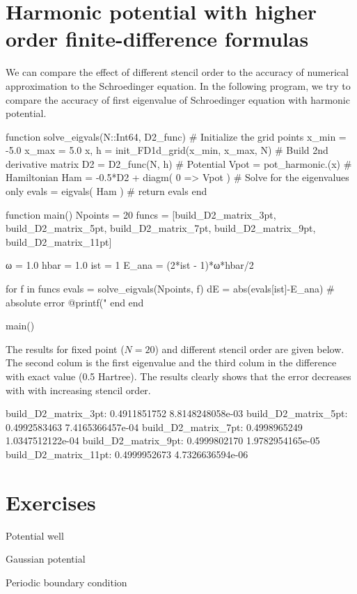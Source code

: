 \section{Harmonic potential with higher order finite-difference formulas}

We can compare the effect of different stencil order to the accuracy of numerical approximation
to the Schroedinger equation. In the following program, we try to compare the accuracy of
first eigenvalue of Schroedinger equation with harmonic potential.

\begin{juliacode}
function solve_eigvals(N::Int64, D2_func)
  # Initialize the grid points
  x_min = -5.0
  x_max =  5.0
  x, h = init_FD1d_grid(x_min, x_max, N)
  # Build 2nd derivative matrix
  D2 = D2_func(N, h)
  # Potential
  Vpot = pot_harmonic.(x)
  # Hamiltonian
  Ham = -0.5*D2 + diagm( 0 => Vpot )
  # Solve for the eigenvalues only
  evals = eigvals( Ham )
  #
  return evals
end

function main()
  Npoints = 20
  funcs = [build_D2_matrix_3pt, build_D2_matrix_5pt, build_D2_matrix_7pt,
           build_D2_matrix_9pt, build_D2_matrix_11pt]

  ω = 1.0
  hbar = 1.0
  ist = 1
  E_ana = (2*ist - 1)*ω*hbar/2

  for f in funcs
      evals = solve_eigvals(Npoints, f)
      dE = abs(evals[ist]-E_ana) # absolute error
      @printf("%
  end
end

main()
\end{juliacode}

The results for fixed point ($N=20$) and different stencil order are given below.
The second colum is the first eigenvalue and the third colum in the difference with
exact value (0.5 Hartree). The results clearly shows that the error decreases with
with increasing stencil order.

\begin{textcode}
  build_D2_matrix_3pt:       0.4911851752   8.8148248058e-03
  build_D2_matrix_5pt:       0.4992583463   7.4165366457e-04
  build_D2_matrix_7pt:       0.4998965249   1.0347512122e-04
  build_D2_matrix_9pt:       0.4999802170   1.9782954165e-05
 build_D2_matrix_11pt:       0.4999952673   4.7326636594e-06
\end{textcode}

\section{Exercises}

Potential well

Gaussian potential

Periodic boundary condition